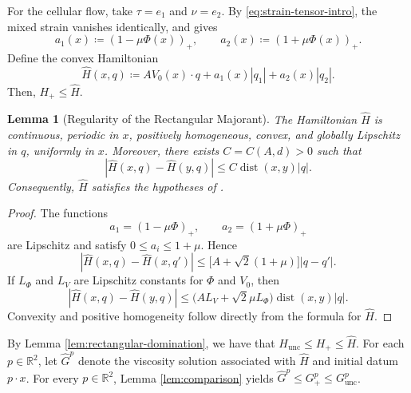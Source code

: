 \documentclass[11pt,reqno,noamsfonts]{amsart}
\newtheorem{lemma}[theorem]{Lemma}
\theoremstyle{definition}
\theoremstyle{remark}
\newcommand{\dist}{\operatorname{dist}}
\newcommand{\Hunc}{H_{\mathrm{unc}}}
\newcommand{\Hcut}{H_{+}}
\newcommand{\Hhat}{\widehat H}
\begin{document}
For the cellular flow, take $\tau=e_1$ and $\nu=e_2$.  By
\eqref{eq:strain-tensor-intro}, the mixed strain vanishes identically,
and  gives
\[
  a_1(x)\coloneqq(1-\mu\Phi(x))_+,
  \qquad
  a_2(x)\coloneqq(1+\mu\Phi(x))_+.
\]
Define the convex Hamiltonian
\[
  \Hhat(x,q)
  \coloneqq A V_0(x)\cdot q+a_1(x)|q_1|+a_2(x)|q_2|.
\]
Then, $\Hcut\le\Hhat$.

\begin{lemma}[Regularity of the Rectangular Majorant]
\label{lem:hat-regularity}
The Hamiltonian $\Hhat$ is continuous, periodic in $x$, positively
homogeneous, convex, and globally Lipschitz in $q$, uniformly in $x$.
Moreover, there exists $C=C(A,d)>0$ such that
\[
  |\Hhat(x,q)-\Hhat(y,q)|
  \le C \dist(x,y)|q|.
\]
Consequently, $\Hhat$ satisfies the hypotheses of
.
\end{lemma}

\begin{proof}
The functions
\[
  a_1=(1-\mu\Phi)_+,
  \qquad
  a_2=(1+\mu\Phi)_+
\]
are Lipschitz and satisfy $0\le a_i\le1+\mu$. Hence
\[
  |\Hhat(x,q)-\Hhat(x,q')|
  \le
  \bigl[A+\sqrt2(1+\mu)\bigr]|q-q'|.
\]
If $L_\Phi$ and $L_V$ are Lipschitz constants for $\Phi$ and $V_0$,
then
\[
  |\Hhat(x,q)-\Hhat(y,q)|
  \le
  \bigl(A L_V+\sqrt2 \mu L_\Phi\bigr)
  \dist(x,y)|q|.
\]
Convexity and positive homogeneity follow directly from the formula for
$\Hhat$.
\end{proof}

By Lemma \ref{lem:rectangular-domination}, we have that 
  $\Hunc\le\Hcut\le\Hhat$.
For each $p\in\mathbb R^2$, let $\widehat G^p$ denote the viscosity
solution associated with $\Hhat$ and initial datum $p\cdot x$. For every $p\in\mathbb R^2$, Lemma \ref{lem:comparison} yields
  $\widehat G^p
  \le G_+^p
  \le G_{\mathrm{unc}}^p$.
\end{document}
